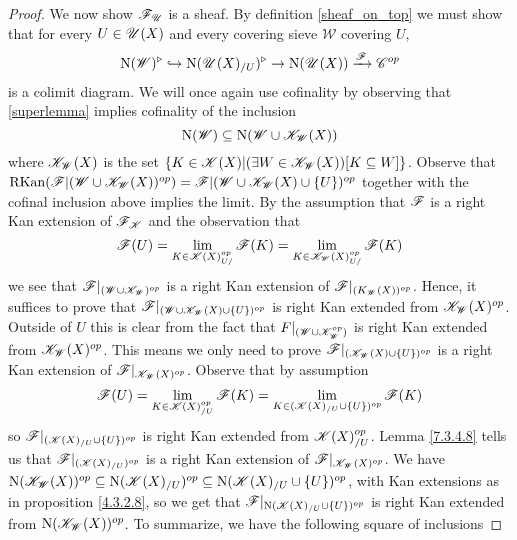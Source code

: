 \documentclass[../../thesis.tex]{subfiles}
\begin{document}
\begin{proof}
    We now show $\mathscr{F}_{\mathscr{U}}$ is a sheaf.
    By definition \ref{sheaf_on_top} we must show that for every $U\in \mathscr{U}(X)$ and every covering sieve $\mathscr{W}$ covering $U$,
    \[
        \mathrm{N}(\mathscr{W})^{\triangleright} \hookrightarrow \mathrm{N}(\mathscr{U}(X)_{/U})^{\triangleright} \rightarrow \mathrm{N}(\mathscr{U}(X))\xrightarrow{\mathscr{F}}\mathscr{C}^{op}
    \]
    is a colimit diagram.
    We will once again use cofinality by observing that \ref{superlemma} implies cofinality of the inclusion
    \[
        \mathrm{N}(\mathscr{W}) \subseteq \mathrm{N}(\mathscr{W} \cup \mathscr{K}_{\mathscr{W}}(X))
    \]
    where $\mathscr{K}_{\mathscr{W}}(X)$ is the set $\{K\in \mathscr{K}(X) | (\exists W \in \mathscr{K}_{\mathscr{W}}(X))[K \subseteq W] \}$.
    Observe that $\mathrm{RKan}(\mathscr{F}|(\mathscr{W} \cup \mathscr{K}_{\mathscr{W}}(X))^{op}) = \mathscr{F}|(\mathscr{W} \cup \mathscr{K}_{\mathscr{W}}(X) \cup \{U\})^{op}$ together with the cofinal inclusion above implies the limit.
    By the assumption that $\mathscr{F}$ is a right Kan extension of $\mathscr{F}_{\mathscr{K}}$ and the observation that
    \[
        \F(U) = \lim_{K\in \K(X)^{op}_{U/}}\F(K) = \lim_{K\in \K_{\W}(X)^{op}_{U/}}\F(K) %
    \]
    we see that $\mathscr{F}|_{(\mathscr{W} \cup \mathscr{K}_{\mathscr{W}})^{op}}$ is a right Kan extension of $\mathscr{F}|_{(K_{\mathscr{W}}(X))^{op}}$.
    Hence, it suffices to prove that $\mathscr{F}|_{(\mathscr{W} \cup \mathscr{K}_{\mathscr{W}}(X)\cup \{U\})^{op}}$ is right Kan extended from $\mathscr{K}_{\mathscr{W}}(X)^{op}$.
    Outside of $U$ this is clear from the fact that $F|_{(\mathscr{W} \cup \mathscr{K}_{\mathscr{W}}^{op})}$ is right Kan extended from $\mathscr{K}_{\mathscr{W}}(X)^{op}$.
    This means we only need to prove $\mathscr{F}|_{(\mathscr{K}_{\mathscr{W}}(X)\cup \{U\})^{op}}$ is a right Kan extension of $\mathscr{F}|_{\mathscr{K}_{\mathscr{W}}(X)^{op}}$.
    Observe that by assumption
    \[
        \mathscr{F}(U)  = \lim_{K\in \mathscr{K}(X)_{/U}^{op}} \mathscr{F}(K) = \lim_{K\in (\mathscr{K}(X)_{/U} \cup \{U\})^{op}} \mathscr{F}(K)
    \]
    so $\mathscr{F}|_{(\mathscr{K}(X)_{/U} \cup \{U\})^{op}}$ is right Kan extended from $\mathscr{K}(X)_{/U}^{op}$.
    Lemma \ref{7.3.4.8} tells us that $\mathscr{F}|_{(\mathscr{K}(X)_{/U})^{op}}$ is a right Kan extension of $\mathscr{F}|_{\mathscr{K}_{\mathscr{W}}(X)^{op}}$.
    We have ${\mathrm{N}(\mathscr{K}_{\mathscr{W}}(X))^{op} \subseteq\mathrm{N}(\mathscr{K}(X)_{/U})^{op} \subseteq\mathrm{N}(\mathscr{K}(X)_{/U} \cup \{U\})^{op}}$, with Kan extensions as in proposition \ref{4.3.2.8}, so we get that ${\mathscr{F}|_{\mathrm{N}(\mathscr{K}(X)_{/U} \cup \{U\})^{op}}}$ is right Kan extended from ${\mathrm{N}(\mathscr{K}_{\mathscr{W}}(X))^{op}}$.
    To summarize, we have the following square of inclusions

\end{proof}
\end{document}
